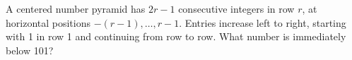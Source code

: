 A centered number pyramid has $2r-1$ consecutive integers in row $r$, at horizontal positions $-(r-1),\ldots,r-1$. Entries increase left to right, starting with 1 in row 1 and continuing from row to row. What number is immediately below 101?
